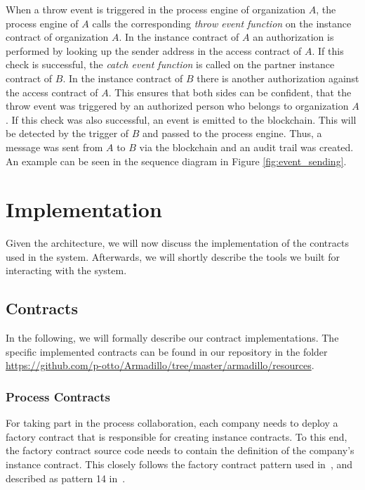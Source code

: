 \documentclass[runningheads]{llncs}
\begin{document}
When a throw event is triggered in the process engine of organization $A$, the process engine of $A$ calls the corresponding \emph{throw event function} on the instance contract of organization $A$.
In the instance contract of $A$ an authorization is performed by looking up the sender address in the access contract of $A$.
If this check is successful, the \emph{catch event function} is called on the partner instance contract of $B$.
In the instance contract of $B$ there is another authorization against the access contract of $A$.
This ensures that both sides can be confident, that the throw event was triggered by an authorized person who belongs to organization $A$.
If this check was also successful, an event is emitted to the blockchain.
This will be detected by the trigger of $B$ and passed to the process engine.
Thus, a message was sent from $A$ to $B$ via the blockchain and an audit trail was created.
An example can be seen in the sequence diagram in Figure \ref{fig:event_sending}.

\section{Implementation} \label{implementation}

Given the architecture, we will now discuss the implementation of the contracts used in the system.
Afterwards, we will shortly describe the tools we built for interacting with the system.

\subsection{Contracts}

In the following, we will formally describe our contract implementations.
The specific implemented contracts can be found in our repository in the folder\\\url{https://github.com/p-otto/Armadillo/tree/master/armadillo/resources}.

\subsubsection{Process Contracts}

For taking part in the process collaboration, each company needs to deploy a factory contract that is responsible for creating instance contracts.
To this end, the factory contract source code needs to contain the definition of the company's instance contract.
This closely follows the factory contract pattern used in~\cite{weber2016untrusted}, and described as pattern 14 in~\cite{xu2018pattern}.
\end{document}
